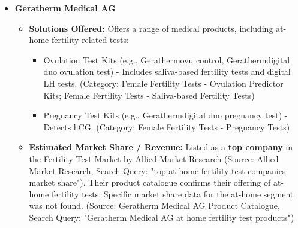 \documentclass{article}
\begin{document}
\begin{itemize}[label=\textbullet]
    \item \textbf{Geratherm Medical AG}
    \begin{itemize}[label=--]
        \item \textbf{Solutions Offered:} Offers a range of medical products, including at-home fertility-related tests:
        \begin{itemize}[label=$\circ$]
            \item Ovulation Test Kits (e.g., Geratherm\textregistered ovu control, Geratherm\textregistered digital duo ovulation test) - Includes saliva-based fertility tests and digital LH tests. (Category: Female Fertility Tests - Ovulation Predictor Kits; Female Fertility Tests - Saliva-based Fertility Tests)
            \item Pregnancy Test Kits (e.g., Geratherm\textregistered digital duo pregnancy test) - Detects hCG. (Category: Female Fertility Tests - Pregnancy Tests)
        \end{itemize}
        \item \textbf{Estimated Market Share / Revenue:} Listed as a \textbf{top company} in the Fertility Test Market by Allied Market Research (Source: Allied Market Research, Search Query: "top at home fertility test companies market share"). Their product catalogue confirms their offering of at-home fertility tests. Specific market share data for the at-home segment was not found. (Source: Geratherm Medical AG Product Catalogue, Search Query: "Geratherm Medical AG at home fertility test products")
    \end{itemize}
    \vspace{0.5em} %


\end{itemize}
\end{document}
